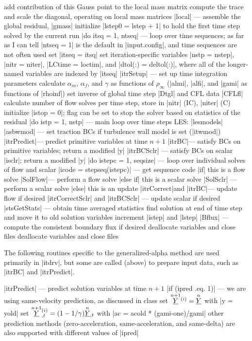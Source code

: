\documentclass[11pt]{article}
\begin{document}
\begin{outline}[deep]
				\5 add contribution of this Gauss point to the local mass matrix
			\4 compute the trace and scale the diagonal, operating on local mass matrices
			\4 |local| --- assemble the global residual, |gmass|
	\2 initialize |lstep0 = lstep + 1| to hold the first time step solved by the current run
	\2 |do itsq = 1, ntseq| --- loop over time sequences; as far as I can tell |ntseq = 1| is the default in |input.config|, and time sequences are not often used
		\3 set |itseq = itsq|
		\3 set iteration-specific variables |nstp = nstep|, |nitr = niter|, |LCtime = loctim|, and |dtol(:) = deltol(:)|, where all of the longer-named variables are indexed by |itseq|
		\3 |itrSetup| --- set up time integration parameters
			\4 calculate $\alpha_m$, $\alpha_f$, and $\gamma$ as functions of $\rho_\infty$ (|almi|, |alfi|, and |gami| as functions of |rhoinf|)
			\4 set inverse of global time step |Dtgl| and CFL data |CFLfl|
		\3 calculate number of flow solves per time step, store in |nitr| (IC), |niter| (C)
		\3 initialize |istop = 0|; flag can be set to stop the solver based on statistics of the residual
		\3 |do istp = 1, nstp| --- main loop over time steps
			\4 LES: |lesmodels|
			\4 |asbwmod| --- set traction BCs if turbulence wall model is set (|itwmod|)
			\4 |itrPredict|\ra --- predict primitive variables at time $n+1$
			\4 |itrBC|\ra --- satisfy BCs on primitive variables; return a modified |y|
			\4 |itrBCSclr| --- satisfy BCs on scalar |isclr|; return a modified |y|
			\4 |do istepc = 1, seqsize| --- loop over individual solves of flow and scalar
				\5 |icode = stepseq(istepc)| --- get sequence code
				\5 |if| this is a flow solve
					\6 |SolFlow|\ra --- perform a flow solve
				\5 |else if| this is a scalar solve
					\6 |SolSclr| --- perform a scalar solve
				\5 |else| this is an update
					\6 |itrCorrect|\ra and |itrBC|\ra --- update flow if desired
					\6 |itrCorrectSclr| and |itrBCSclr| --- update scalar if desired
			\4 |stsGetStats| --- obtain time averaged statistics
			\4 find solution at end of time step and move it to old solution variables
			\4 increment |istep| and |lstep|
			\4 |Bflux| --- compute the consistent boundary flux if desired
		\3 deallocate variables and close files
	\2 deallocate variables and close files
\end{outline}

The following routines specific to the generalized-alpha method are used primarily in |itdrv|, but some are called (above) to prepare input data, such as |itrBC| and |itrPredict|.

\begin{outline}[deep]
\1 |itrPredict| --- predict solution variables at time $n+1$
	\2 |if (ipred .eq. 1)| --- we are using same-velocity prediction, as discussed in class
		\3 set $\oset{n+1}{\ul{Y}}^{(i)} = \oset{n}{\ul{Y}}$ with |y = yold|
		\3 set $\oset{n+1}{\ul{Y}}^{(i)}_{,t} = (1-1/\gamma) \oset{n}{\ul{Y}}_{,t}$ with |ac = acold * (gami-one)/gami|
	\2 other prediction methods (zero-acceleration, same-acceleration, and same-delta) are also supported with different values of |ipred|
\end{outline}
\end{document}
